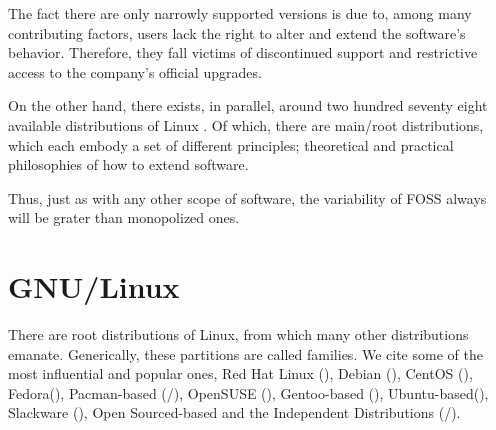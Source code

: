 \documentclass[
12pt,				%
openright,			%
oneside,			%
a4paper,			%
brazil,				%
english,			%
]{abntex2}
\begin{document}

The fact there are only narrowly supported versions is due to, among
many contributing factors, users lack the right to alter and extend
the software's behavior. Therefore, they fall victims of discontinued
support and restrictive access to the company's official upgrades. 

On the other hand, there exists, in parallel, around two hundred
seventy eight available distributions of Linux
\cite{wikipedia_2021Linux}. Of which, there are main/root
distributions, which each embody a set of different principles; theoretical and practical philosophies of how to extend software.  

Thus, just as with any other scope of software, the variability of
FOSS always will be grater than monopolized ones.

\section{GNU/Linux}
There are root distributions of Linux, from which many other
distributions emanate. Generically, these partitions are called
families. We cite some of the most influential and popular ones, Red
Hat Linux (), Debian (), CentOS
(), Fedora(), Pacman-based
(/), OpenSUSE (),
Gentoo-based (), Ubuntu-based(),
Slackware (), Open Sourced-based and the
Independent Distributions (/).
\end{document}
